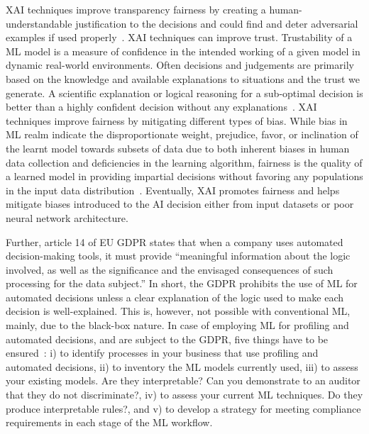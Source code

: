 \hspace*{3.5mm} XAI techniques improve transparency fairness by creating a human-understandable justification to the decisions and could find and deter adversarial examples if used properly~\cite{das2020opportunities}. XAI techniques can improve trust. Trustability of a ML model is a measure of confidence in the intended working of a given model in dynamic real-world environments. Often decisions and judgements are primarily based on the knowledge and available explanations to situations and the trust we generate. A scientific explanation or logical reasoning for a sub-optimal decision is better than a highly confident decision without any explanations~\cite{das2020opportunities}. XAI techniques improve fairness by mitigating different types of bias. While bias in ML realm indicate the disproportionate weight, prejudice, favor, or inclination of the learnt model towards subsets of data due to both inherent biases in human data collection and deficiencies in the learning algorithm, fairness is the quality of a learned model in providing impartial decisions without favoring any populations in the input data distribution~\cite{das2020opportunities}.
Eventually, XAI promotes fairness and helps mitigate biases introduced to the AI decision either from input datasets or poor neural network architecture.

\hspace*{3.5mm} Further, article 14 of EU GDPR states that when a company uses automated decision-making tools, it must provide ``meaningful information about the logic involved, as well as the significance and the envisaged consequences of such processing for the data subject.” In short, the GDPR prohibits the use of ML for automated decisions unless a clear explanation of the logic used to make each decision is well-explained. This is, however, not possible with conventional ML, mainly, due to the black-box nature. In case of employing ML for profiling and automated decisions, and are subject to the GDPR, five things have to be ensured~\cite{doshi2017towards}: i) to identify processes in your business that use profiling and automated decisions, ii) to inventory the ML models currently used, iii) to assess your existing models. Are they interpretable? Can you demonstrate to an auditor that they do not discriminate?, iv) to assess your current ML techniques. Do they produce interpretable rules?, and v) to develop a strategy for meeting compliance requirements in each stage of the ML workflow. \\

